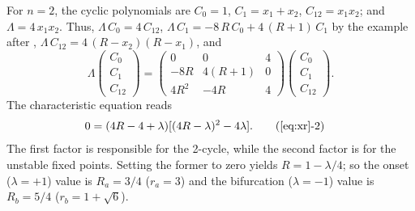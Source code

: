 \documentclass{ws-ijbc}
\begin{document}
For $n = 2$, the cyclic polynomials
  are
$C_0 = 1$,
$C_1 = x_1 + x_2$,
$C_{12} = x_1 x_2$;
and $\Lambda = 4 \, x_1 x_2$.
Thus,
$\Lambda \, C_0 = 4 \, C_{12}$,
$\Lambda \, C_1 %
  = -8 \, R \, C_0 + 4 \, (R + 1) \, C_1$
by the example after ,
$\Lambda \, C_{12}
  = 4 \, (R - x_2) (R - x_1)$,
and
\[
\Lambda
  \left( \begin{array}{c}
  C_0 \\
  C_1 \\
  C_{12}
  \end{array} \right)
 =
  \left( \begin{array}{ccc}
  0           & 0         & 4 \\
  -8R         & 4(R+1)    & 0 \\
  4R^2        & -4R       & 4
  \end{array} \right)
  \left( \begin{array}{c}
  C_0 \\
  C_1 \\
  C_{12}
  \end{array} \right).
\]
%
%
%
The characteristic equation  reads
%
%
%
\begin{align}
0 &= (4R - 4 + \lambda) [(4 R-\lambda)^2 - 4 \lambda].
  \tag{\ref{eq:xr}-2}
\label{eq:xr2}
\end{align}
%
%
%
The first factor is responsible for the 2-cycle,
  while the second factor is for the unstable fixed points. %
Setting the former to zero yields $R = 1 - \lambda/4$;
so the onset ($\lambda = +1$) value is $R_a = 3/4$ ($r_a = 3$)
and the bifurcation ($\lambda = -1$) value is $R_b = 5/4$ ($r_b = 1+\sqrt 6$).
%
\end{document}
